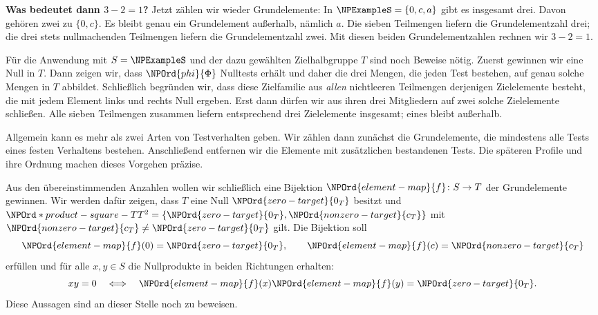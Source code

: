 \medskip\noindent\textbf{Was bedeutet dann \(3-2=1\)?}
Jetzt zählen wir wieder Grundelemente: In \(\NPExampleS=\{0,c,a\}\) gibt es
insgesamt drei. Davon gehören zwei zu \(\{0,c\}\). Es bleibt genau
ein Grundelement außerhalb, nämlich \(a\).
Die sieben Teilmengen liefern die Grundelementzahl drei; die drei
stets nullmachenden Teilmengen liefern die Grundelementzahl zwei.
Mit diesen beiden Grundelementzahlen rechnen wir \(3-2=1\).

Für die Anwendung mit \(S=\NPExampleS\) und der dazu gewählten
Zielhalbgruppe \(T\) sind noch
Beweise nötig. Zuerst gewinnen wir eine Null in \(T\).
Dann zeigen wir, dass \(\NPOrd{phi}{\Phi}\) Nulltests erhält und daher die drei
Mengen, die jeden Test bestehen, auf genau solche Mengen in \(T\)
abbildet. Schließlich begründen wir, dass diese Zielfamilie aus
\emph{allen} nichtleeren Teilmengen derjenigen Zielelemente besteht,
die mit jedem Element links und rechts Null ergeben.
Erst dann dürfen wir aus ihren drei Mitgliedern auf zwei solche
Zielelemente schließen. Alle sieben Teilmengen zusammen liefern
entsprechend drei Zielelemente insgesamt; eines bleibt außerhalb.

Allgemein kann es mehr als zwei Arten von Testverhalten geben.
Wir zählen dann zunächst die Grundelemente, die mindestens alle Tests
eines festen Verhaltens bestehen. Anschließend entfernen wir die
Elemente mit zusätzlichen bestandenen Tests. Die späteren Profile
und ihre Ordnung machen dieses Vorgehen präzise.

Aus den übereinstimmenden Anzahlen wollen wir schließlich eine
Bijektion \(\NPOrd{element-map}{f}\colon S\to T\) der Grundelemente gewinnen.
Wir werden dafür zeigen, dass \(T\) eine Null \(\NPOrd{zero-target}{0_T}\) besitzt und
\(\NPOrd*{product-square-T}{T^2}=\{\NPOrd{zero-target}{0_T},\NPOrd{nonzero-target}{c_T}\}\) mit \(\NPOrd{nonzero-target}{c_T}\ne\NPOrd{zero-target}{0_T}\) gilt. Die Bijektion soll
\[
 \NPOrd{element-map}{f}(0)=\NPOrd{zero-target}{0_T},\qquad \NPOrd{element-map}{f}(c)=\NPOrd{nonzero-target}{c_T}
\]
erfüllen und für alle \(x,y\in S\) die Nullprodukte in beiden
Richtungen erhalten:
\[
 xy=0\quad\Longleftrightarrow\quad \NPOrd{element-map}{f}(x)\NPOrd{element-map}{f}(y)=\NPOrd{zero-target}{0_T}.
\]
Diese Aussagen sind an dieser Stelle noch zu beweisen.

